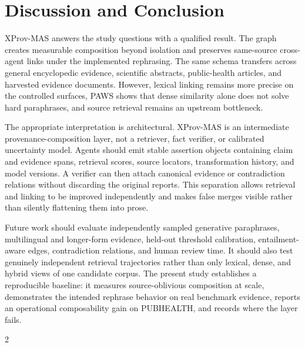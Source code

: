 \documentclass[graybox]{svmult}
\begin{document}
\section{Discussion and Conclusion}

XProv-MAS answers the study questions with a qualified result. The graph creates measurable composition beyond isolation and preserves same-source cross-agent links under the implemented rephrasing. The same schema transfers across general encyclopedic evidence, scientific abstracts, public-health articles, and harvested evidence documents. However, lexical linking remains more precise on the controlled surfaces, PAWS shows that dense similarity alone does not solve hard paraphrases, and source retrieval remains an upstream bottleneck.

The appropriate interpretation is architectural. XProv-MAS is an intermediate provenance-composition layer, not a retriever, fact verifier, or calibrated uncertainty model. Agents should emit stable assertion objects containing claim and evidence spans, retrieval scores, source locators, transformation history, and model versions. A verifier can then attach canonical evidence or contradiction relations without discarding the original reports. This separation allows retrieval and linking to be improved independently and makes false merges visible rather than silently flattening them into prose.

Future work should evaluate independently sampled generative paraphrases, multilingual and longer-form evidence, held-out threshold calibration, entailment-aware edges, contradiction relations, and human review time. It should also test genuinely independent retrieval trajectories rather than only lexical, dense, and hybrid views of one candidate corpus. The present study establishes a reproducible baseline: it measures source-oblivious composition at scale, demonstrates the intended rephrase behavior on real benchmark evidence, reports an operational composability gain on PUBHEALTH, and records where the layer fails.


\begin{multicols}{2}


\end{multicols}
\end{document}

